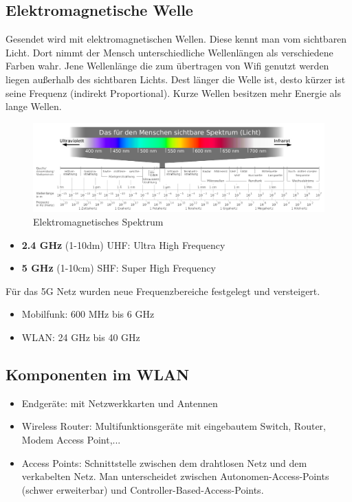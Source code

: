 \subsection*{Elektromagnetische Welle}
Gesendet wird mit elektromagnetischen Wellen. Diese kennt man vom sichtbaren Licht. Dort nimmt der Mensch unterschiedliche Wellenlängen als verschiedene Farben wahr. Jene Wellenlänge die zum übertragen von Wifi genutzt werden liegen außerhalb des sichtbaren Lichts. Dest länger die Welle ist, desto kürzer ist seine Frequenz (indirekt Proportional). Kurze Wellen besitzen mehr Energie als lange Wellen.
\begin{figure}[H]
	\centering
	\includegraphics[width=1.0\linewidth]{figures/elektro_spektrum.png}
	\caption{Elektromagnetisches Spektrum}
\end{figure}
\begin{itemize}
	\item \textbf{2.4 GHz} (1-10dm) UHF: Ultra High Frequency
	\item \textbf{5 GHz} (1-10cm) SHF: Super High Frequency
\end{itemize}
Für das 5G Netz wurden neue Frequenzbereiche festgelegt und versteigert.
\begin{itemize}
	\item Mobilfunk: 600 MHz bis 6 GHz
	\item WLAN: 24 GHz bis 40 GHz
\end{itemize}

\subsection*{Komponenten im WLAN}
\begin{itemize}
	\item Endgeräte: mit Netzwerkkarten und Antennen
	\item Wireless Router: Multifunktionsgeräte mit eingebautem Switch, Router, Modem Access Point,...
	\item Access Points: Schnittstelle zwischen dem drahtlosen Netz und dem verkabelten Netz. Man unterscheidet zwischen Autonomen-Access-Points (schwer erweiterbar) und Controller-Based-Access-Points.
\end{itemize}

